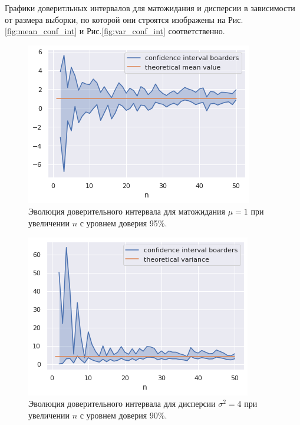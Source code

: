 Графики доверитльных интервалов для матожидания и дисперсии в зависимости
 от размера выборки, по которой они строятся изображены на Рис.
 \eqref{fig:mean_conf_int} и Рис.\eqref{fig:var_conf_int} соответственно.

\begin{figure}[ht]
	\centering
	\includegraphics[width = 0.7\linewidth]{"./resources/mean_conf_int.png"}
	\caption{Эволюция доверительного интервала для матожидания $ \mu = 1 $ при
	 увеличении $ n $ с уровнем доверия 95\%.}
    \label{fig:mean_conf_int}
\end{figure}
\begin{figure}[ht]
	\centering
	\includegraphics[width = 0.7\linewidth]{"./resources/var_conf_int.png"}
	\caption{Эволюция доверительного интервала для дисперсии $ \sigma^2 = 4 $ при
	 увеличении $ n $ с уровнем доверия 90\%.}
    \label{fig:var_conf_int}
\end{figure}

